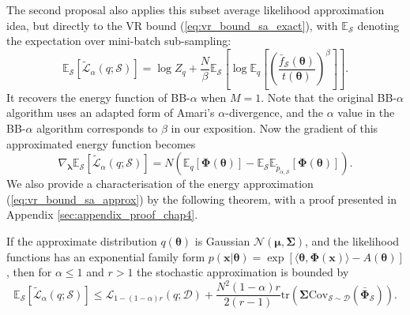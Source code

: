 %
The second proposal also applies this subset average likelihood approximation idea, but directly to the VR bound (\ref{eq:vr_bound_sa_exact}), with $\mathbb{E}_{\mathcal{S}}$ denoting the expectation over mini-batch sub-sampling:
\begin{equation}
\mathbb{E}_{\mathcal{S}} \left[ \tilde{\mathcal{L}}_{\alpha}(q; \mathcal{S}) \right] = \log Z_q + \frac{N}{\beta} \mathbb{E}_{\mathcal{S}} \left[ \log \mathbb{E}_{q} \left[ \left( \frac{ \bar{f}_{\mathcal{S}}(\bm{\theta})} {t(\bm{\theta})} \right)^{\beta} \right] \right].
\label{eq:vr_bound_sa_approx}
\end{equation}
It recovers the energy function of BB-$\alpha$ when $M=1$. Note that the original BB-$\alpha$ algorithm uses an adapted form of Amari's $\alpha$-divergence, and the $\alpha$ value in the BB-$\alpha$ algorithm corresponds to $\beta$ in our exposition. Now the gradient of this approximated energy function becomes
\begin{equation}
\nabla_{\bm{\lambda}} \mathbb{E}_{\mathcal{S}} \left[ \tilde{\mathcal{L}}_{\alpha}(q; \mathcal{S}) \right] = N (\mathbb{E}_{q}[\bm{\Phi}(\bm{\theta})] - \mathbb{E}_{\mathcal{S}} \mathbb{E}_{\tilde{p}_{\alpha, \mathcal{S}}}[\bm{\Phi}(\bm{\theta})]).
\end{equation}
%
We also provide a characterisation of the energy approximation (\ref{eq:vr_bound_sa_approx}) by the following theorem, with a proof presented in Appendix \ref{sec:appendix_proof_chap4}.
%
\begin{theorem}
\label{thm:chap4_vrbound_stochastic_approx}
If the approximate distribution $q(\bm{\theta})$ is Gaussian $\mathcal{N}(\bm{\mu}, \bm{\Sigma})$, and the likelihood functions has an exponential family form $p(\bm{x}|\bm{\theta}) = \exp [\langle \bm{\theta}, \bm{\Phi}(\bm{x}) \rangle - A(\bm{\theta})]$, then for $\alpha \leq 1$ and $r > 1$ the stochastic approximation is bounded by
\begin{equation*}
\mathbb{E}_{\mathcal{S}} [\tilde{\mathcal{L}}_{\alpha}(q; \mathcal{S})] \leq \mathcal{L}_{1 - (1 - \alpha)r}(q; \mathcal{D}) + \frac{N^2(1-\alpha) r}{2(r - 1)}  \mathrm{tr}(\bm{\Sigma} \mathrm{Cov}_{\mathcal{S} \sim \mathcal{D}}( \bar{\bm{\Phi}}_{\mathcal{S}})).
\end{equation*}
\end{theorem}

